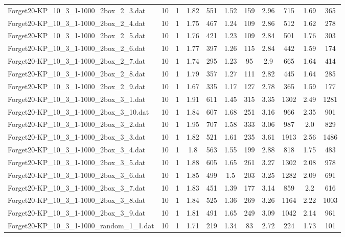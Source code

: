 \begin{table}[!ht]
\begin{tabular}{lcccccccccc}
Forget20-KP\_10\_3\_1-1000\_2box\_2\_3.dat & 10 & 1 & 1.82 & 551 & 1.52 & 159 & 2.96 & 715 & 1.69 & 365 \\
Forget20-KP\_10\_3\_1-1000\_2box\_2\_4.dat & 10 & 1 & 1.75 & 467 & 1.24 & 109 & 2.86 & 512 & 1.62 & 278 \\
Forget20-KP\_10\_3\_1-1000\_2box\_2\_5.dat & 10 & 1 & 1.76 & 421 & 1.23 & 109 & 2.84 & 501 & 1.76 & 303 \\
Forget20-KP\_10\_3\_1-1000\_2box\_2\_6.dat & 10 & 1 & 1.77 & 397 & 1.26 & 115 & 2.84 & 442 & 1.59 & 174 \\
Forget20-KP\_10\_3\_1-1000\_2box\_2\_7.dat & 10 & 1 & 1.74 & 295 & 1.23 & 95 & 2.9 & 665 & 1.64 & 414 \\
Forget20-KP\_10\_3\_1-1000\_2box\_2\_8.dat & 10 & 1 & 1.79 & 357 & 1.27 & 111 & 2.82 & 445 & 1.64 & 285 \\
Forget20-KP\_10\_3\_1-1000\_2box\_2\_9.dat & 10 & 1 & 1.67 & 335 & 1.17 & 127 & 2.78 & 365 & 1.59 & 177 \\
Forget20-KP\_10\_3\_1-1000\_2box\_3\_1.dat & 10 & 1 & 1.91 & 611 & 1.45 & 315 & 3.35 & 1302 & 2.49 & 1281 \\
Forget20-KP\_10\_3\_1-1000\_2box\_3\_10.dat & 10 & 1 & 1.84 & 607 & 1.68 & 251 & 3.16 & 966 & 2.35 & 901 \\
Forget20-KP\_10\_3\_1-1000\_2box\_3\_2.dat & 10 & 1 & 1.95 & 707 & 1.58 & 333 & 3.06 & 987 & 2.0 & 829 \\
Forget20-KP\_10\_3\_1-1000\_2box\_3\_3.dat & 10 & 1 & 1.82 & 521 & 1.61 & 235 & 3.61 & 1913 & 2.56 & 1486 \\
Forget20-KP\_10\_3\_1-1000\_2box\_3\_4.dat & 10 & 1 & 1.8 & 563 & 1.55 & 199 & 2.88 & 818 & 1.75 & 483 \\
Forget20-KP\_10\_3\_1-1000\_2box\_3\_5.dat & 10 & 1 & 1.88 & 605 & 1.65 & 261 & 3.27 & 1302 & 2.08 & 978 \\
Forget20-KP\_10\_3\_1-1000\_2box\_3\_6.dat & 10 & 1 & 1.85 & 499 & 1.5 & 203 & 3.25 & 1282 & 2.09 & 691 \\
Forget20-KP\_10\_3\_1-1000\_2box\_3\_7.dat & 10 & 1 & 1.83 & 451 & 1.39 & 177 & 3.14 & 859 & 2.2 & 616 \\
Forget20-KP\_10\_3\_1-1000\_2box\_3\_8.dat & 10 & 1 & 1.84 & 525 & 1.36 & 269 & 3.26 & 1164 & 2.22 & 1003 \\
Forget20-KP\_10\_3\_1-1000\_2box\_3\_9.dat & 10 & 1 & 1.81 & 491 & 1.65 & 249 & 3.09 & 1042 & 2.14 & 961 \\
Forget20-KP\_10\_3\_1-1000\_random\_1\_1.dat & 10 & 1 & 1.71 & 219 & 1.34 & 83 & 2.72 & 224 & 1.73 & 101 \\

\end{tabular}
\end{table}
